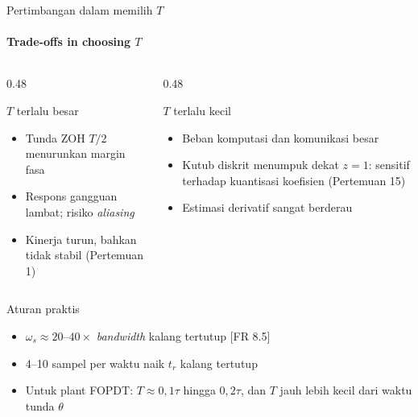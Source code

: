 \documentclass[aspectratio=169,10pt]{beamer}
\begin{document}
\begin{frame}{Pertimbangan dalam memilih $T$}
	\framesubtitle{Trade-offs in choosing $T$}
	\begin{columns}[T]
		\begin{column}{0.48\textwidth}
			\begin{alertblock}{$T$ terlalu besar}
				\small
				\begin{itemize}
					\item Tunda ZOH $T/2$ menurunkan margin fasa
					\item Respons gangguan lambat; risiko \textit{aliasing}
					\item Kinerja turun, bahkan tidak stabil (Pertemuan 1)
				\end{itemize}
			\end{alertblock}
		\end{column}
		\begin{column}{0.48\textwidth}
			\begin{alertblock}{$T$ terlalu kecil}
				\small
				\begin{itemize}
					\item Beban komputasi dan komunikasi besar
					\item Kutub diskrit menumpuk dekat $z=1$: sensitif terhadap kuantisasi koefisien (Pertemuan 15)
					\item Estimasi derivatif sangat berderau
				\end{itemize}
			\end{alertblock}
		\end{column}
	\end{columns}
	\vspace{0.3cm}
	\begin{block}{Aturan praktis }
		\small
		\begin{itemize}
			\item $\omega_s \approx 20$--$40\times$ \textit{bandwidth} kalang tertutup [FR 8.5]
			\item 4--10 sampel per waktu naik $t_r$ kalang tertutup
			\item Untuk plant FOPDT: $T \approx 0{,}1\tau$ hingga $0{,}2\tau$, dan $T$ jauh lebih kecil dari waktu tunda $\theta$
		\end{itemize}
	\end{block}
\end{frame}
\end{document}
